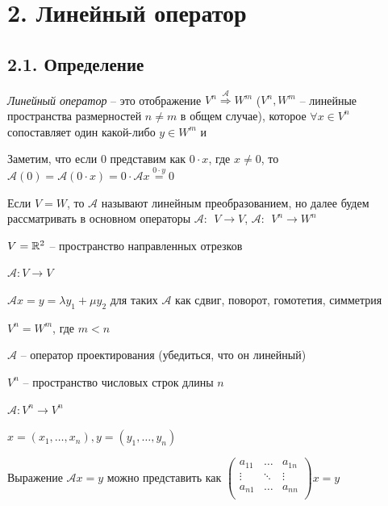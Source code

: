 \documentclass[12pt]{article}
\begin{document}
    \clearpage

    \section[p2]{2. Линейный оператор}

    \hypertarget{linearoperatordefinition}{}

    \subsection[p2\_1]{2.1. Определение}

    \Def \textit{Линейный оператор} -- это отображение $V^n \stackrel{\mathcal{A}}{\Longrightarrow} W^m$
    ($V^n, W^m$ -- линейные пространства размерностей $n \neq m$ в общем случае),
    которое $\forall x \in V^n$ сопоставляет один какой-либо $y \in W^m$ и

    \Nota Заметим, что если 0 представим как $0 \cdot x$, где $x \neq 0$, то
    $\mathcal{A}(0) = \mathcal{A}(0 \cdot x) = 0 \cdot \mathcal{A}x \stackrel{0 \cdot y}{=} 0$

    \Notas Если $V = W$, то $\mathcal{A}$ называют линейным преобразованием, но далее будем рассматривать в основном операторы $\mathcal{A}: \ \ V \rightarrow V$, $\mathcal{A}: \ \ V^n \rightarrow W^n$


     $V = \mathbb{R}^2$ -- пространство направленных отрезков

    $\mathcal{A} : V \rightarrow V$

    $\mathcal{A}x = y = \lambda y_1 + \mu y_2$ для таких $\mathcal{A}$ как сдвиг, поворот, гомотетия, симметрия

     $V^n = W^m$, где $m < n$

    $\mathcal{A}$ -- оператор проектирования (убедиться, что он линейный)

     $V^n$ -- пространство числовых строк длины $n$

    $\mathcal{A}: V^n \rightarrow V^n$

    $x = (x_1, \dots, x_n), y = (y_1, \dots, y_n)$

    Выражение $\mathcal{A}x = y$ можно представить как 
    $\begin{pmatrix}
    a_{11} & \ldots & a_{1n}\\
    \vdots & \ddots & \vdots\\
    a_{n1} & \ldots & a_{nn}\\
    \end{pmatrix} x = y$
\end{document}

